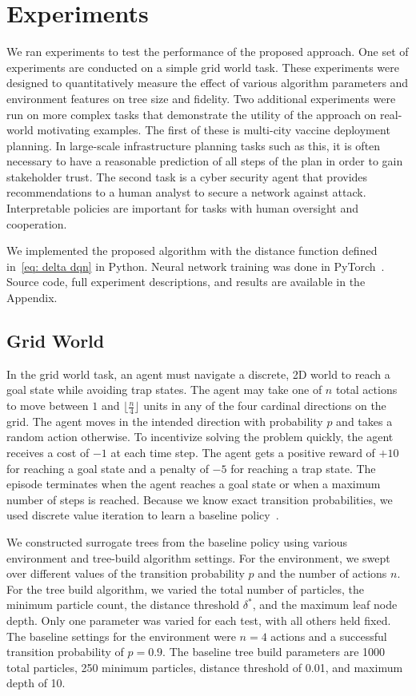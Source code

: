 \documentclass[letterpaper]{article} %
\begin{document}
\section{Experiments}
We ran experiments to test the performance of the proposed approach.
One set of experiments are conducted on a simple grid world task.
These experiments were designed to quantitatively measure the effect of various algorithm parameters and environment features on tree size and fidelity.
Two additional experiments were run on more complex tasks that demonstrate the utility of the approach on real-world motivating examples.
The first of these is multi-city vaccine deployment planning.
In large-scale infrastructure planning tasks such as this, it is often necessary to have a reasonable prediction of all steps of the plan in order to gain stakeholder trust.
The second task is a cyber security agent that provides recommendations to a human analyst to secure a network against attack.
Interpretable policies are important for tasks with human oversight and cooperation.

We implemented the proposed algorithm with the distance function defined in~\cref{eq: delta dqn} in Python. %
Neural network training was done in PyTorch~\cite{paszke2015}.
Source code, full experiment descriptions, and results are available in the Appendix.
\subsection{Grid World}
In the grid world task, an agent must navigate a discrete, 2D world to reach a goal state while avoiding trap states.
The agent may take one of $n$ total actions to move between $1$ and $\lfloor \frac{n}{4}\rfloor$ units in any of the four cardinal directions on the grid.
The agent moves in the intended direction with probability $p$ and takes a random action otherwise.
To incentivize solving the problem quickly, the agent receives a cost of $-1$ at each time step.
The agent gets a positive reward of $+10$ for reaching a goal state and a penalty of $-5$ for reaching a trap state.
The episode terminates when the agent reaches a goal state or when a maximum number of steps is reached.
Because we know exact transition probabilities, we used discrete value iteration to learn a baseline policy~\cite{sutton1998}.

We constructed surrogate trees from the baseline policy using various environment and tree-build algorithm settings.
For the environment, we swept over different values of the transition probability $p$ and the number of actions $n$.
For the tree build algorithm, we varied the total number of particles, the minimum particle count, the distance threshold $\delta^*$, and the maximum leaf node depth.
Only one parameter was varied for each test, with all others held fixed.
The baseline settings for the environment were $n=4$ actions and a successful transition probability of $p=0.9$.
The baseline tree build parameters are 1000 total particles, 250 minimum particles, distance threshold of 0.01, and maximum depth of 10.
\end{document}
